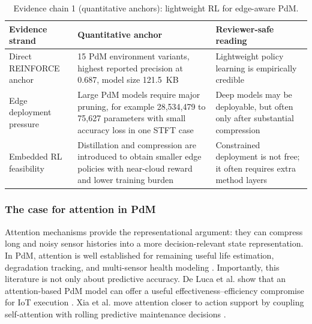 \documentclass[refree,sn-basic]{sn-jnl} %
\begin{document}
\begin{table}[t]
        \centering
        \small
        \setlength{\tabcolsep}{4pt}
        \begin{tabular}{p{} p{} p{}}
                \toprule
                Evidence strand & Quantitative anchor & Reviewer-safe reading \\
                \midrule
                Direct REINFORCE anchor & 15 PdM environment variants, highest reported precision at 0.687, model size 121.5~KB \cite{Siraskar2025} & Lightweight policy learning is empirically credible \\
                Edge deployment pressure & Large PdM models require major pruning, for example 28,534,479 to 75,627 parameters with small accuracy loss in one STFT case \cite{Pandey2023} & Deep models may be deployable, but often only after substantial compression \\
                Embedded RL feasibility & Distillation and compression are introduced to obtain smaller edge policies with near-cloud reward and lower training burden \cite{Jang2020, Xu2022, Szydlo2022} & Constrained deployment is not free; it often requires extra method layers \\
                \bottomrule
        \end{tabular}
        \caption{Evidence chain 1 (quantitative anchors): lightweight RL for edge-aware PdM.}
        \label{tab:evidence_chain1_quant}
\end{table}

\subsubsection{The case for attention in PdM}
Attention mechanisms provide the representational argument: they can compress long and noisy sensor histories into a more decision-relevant state representation. In PdM, attention is well established for remaining useful life estimation, degradation tracking, and multi-sensor health modeling \cite{Chen2020, Chen2021, Chadha2022, DeLuca2023}. Importantly, this literature is not only about predictive accuracy. De Luca et al. show that an attention-based PdM model can offer a useful effectiveness--efficiency compromise for IoT execution \cite{DeLuca2023}. Xia et al. move attention closer to action support by coupling self-attention with rolling predictive maintenance decisions \cite{Xia2022}.
\end{document}
